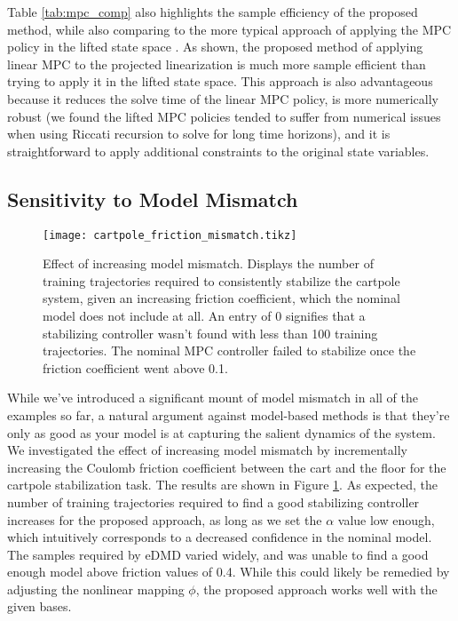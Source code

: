 \documentclass{article}
\begin{document}
      Table \ref{tab:mpc_comp} also highlights the sample efficiency of the proposed method, while
      also comparing to the more typical approach of applying the MPC policy in the lifted state
      space \cite{Korda2018,Folkestad2021,Narasingam2022}.  As shown, the proposed method of
      applying linear MPC to the projected linearization is much more sample efficient than trying
      to apply it in the lifted state space. This approach is also advantageous because it reduces
      the solve time of the linear MPC policy, is more numerically robust (we found the lifted MPC
      policies tended to suffer from numerical issues when using Riccati recursion to solve for
      long time horizons), and it is straightforward to apply additional constraints to the
      original state variables.
      
      \subsection{Sensitivity to Model Mismatch}
      \begin{figure}
        \centering
        \texttt{[image: cartpole\_friction\_mismatch.tikz]}
        \caption{Effect of increasing model mismatch. Displays the number of training trajectories
        required to consistently stabilize the cartpole system, given an increasing friction 
        coefficient, which the nominal model does not include at all. An entry of 0 signifies 
        that a stabilizing controller wasn't found with less than 100 training trajectories.
        The nominal MPC controller failed to stabilize once the friction coefficient went above 
        0.1.
        }
        \label{fig:cartpole_friction_mismatch}
      \end{figure}
      
      While we've introduced a significant mount of model mismatch in all of the examples so far, 
      a natural argument against model-based methods is that they're only as good as your model is
      at capturing the salient dynamics of the system. We investigated the effect of increasing
      model mismatch by incrementally increasing the Coulomb friction coefficient between the cart
      and the floor for the cartpole stabilization task. The results are shown in Figure 
      \ref{fig:cartpole_friction_mismatch}. As expected, the number of training trajectories 
      required to find a good stabilizing controller increases for the proposed approach, as long 
      as we set the $\alpha$ value low enough, which intuitively corresponds to a decreased 
      confidence in the nominal model. The samples required by eDMD varied widely, and was unable 
      to find a good enough model above friction values of 0.4. While this could likely be
      remedied by adjusting the nonlinear mapping $\phi$, the proposed approach works well with
      the given bases.
      
\end{document}
